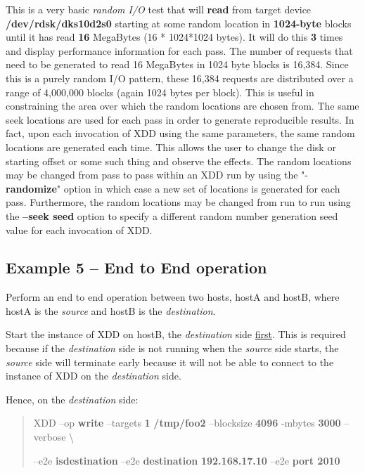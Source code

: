 This is a very basic \emph{random I/O} test that will \textbf{read} from target device \textbf{/dev/rdsk/dks10d2s0} starting at some random location in \textbf{1024-byte} blocks until it has read \textbf{16} MegaBytes (16 * 1024*1024 bytes). It will do this \textbf{3} times and display performance information for each pass. The number of requests that need to be generated to read 16 MegaBytes in 1024 byte blocks is 16,384. Since this is a purely random I/O pattern, these 16,384 requests are distributed over a range of 4,000,000 blocks (again 1024 bytes per block). This is useful in constraining the area over which the random locations are chosen from. The same seek locations are used for each pass in order to generate reproducible results. In fact, upon each invocation of XDD using the same parameters, the same random locations are generated each time. This allows the user to change the disk or starting offset or some such thing and observe the effects. The random locations may be changed from pass to pass within an XDD run by using the "-\textbf{randomize}" option in which case a new set of locations is generated for each pass. Furthermore, the random locations may be changed from run to run using the \textbf{--seek seed} option to specify a different random number generation seed value for each invocation of XDD.

\subsection{Example 5 -- End to End operation}\label{example-5-end-to-end-operation}

Perform an end to end operation between two hosts, hostA and hostB, where hostA is the \emph{source} and hostB is the \emph{destination}.

Start the instance of XDD on hostB, the \emph{destination} side \ul{first}. This is required because if the \emph{destination} side is not running when the \emph{source} side starts, the \emph{source} side will terminate early because it will not be able to connect to the instance of XDD on the \emph{destination} side.

Hence, on the \emph{destination} side:

\begin{quote}
XDD --op \textbf{write} --targets \textbf{1} \textbf{/tmp/foo2} --blocksize \textbf{4096} -mbytes \textbf{3000} --verbose \textbackslash{}

--e2e \textbf{isdestination} --e2e \textbf{destination} \textbf{192.168.17.10} --e2e \textbf{port 2010}
\end{quote}

